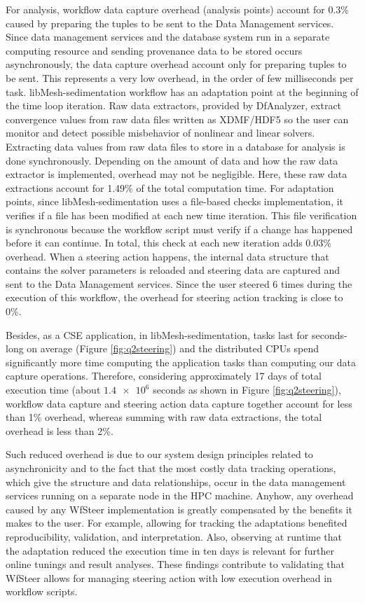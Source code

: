 For analysis, workflow data capture overhead (analysis points) account for 0.3\% caused by preparing the tuples to be sent to the Data Management services.
Since
data management services and the database system run in a separate
computing resource and sending provenance data to be stored occurs
asynchronously, the data capture overhead account only for preparing
tuples to be sent. This represents a very low overhead, in the order of
few milliseconds per task.
libMesh-sedimentation workflow has an adaptation point at the beginning of the time loop iteration.
Raw data extractors, provided by DfAnalyzer, extract convergence values from raw data files written as XDMF/HDF5 so the user can monitor and detect possible misbehavior of nonlinear and linear solvers.
Extracting data values from raw data files to store in a
database for analysis is done synchronously. Depending on the amount
of data and how the raw data extractor is implemented, overhead may not
be negligible. Here, these raw data extractions account for 1.49\% of the total computation time. For adaptation points, since libMesh-sedimentation uses a file-based checks implementation, it verifies if a file has been modified at each new time iteration. This file verification is synchronous because the workflow script must verify if a change has happened before it can continue. In total, this check at each new iteration adds 0.03\% overhead.
When a steering action happens, the internal data structure that contains the solver parameters is reloaded and steering data are captured and sent to the Data Management services. Since the user steered 6 times during the execution of this workflow, the overhead for steering action tracking is close to 0\%.

Besides, as a CSE application, in libMesh-sedimentation, tasks last for seconds-long on average (Figure \ref{fig:q2steering})
and the distributed CPUs spend significantly more time computing the application tasks than computing our data capture operations.
Therefore, considering approximately 17 days of total execution time (about $\num{1.4e6}$ seconds as shown in Figure \ref{fig:q2steering}), workflow data capture and steering action data capture together account for less than 1\% overhead, whereas summing with raw data extractions, the total overhead is less than 2\%.


Such reduced overhead is due to our system design principles related to asynchronicity and to the fact that the most costly data tracking operations, which give the structure and
data relationships, occur in the data management services running on a separate node in the HPC machine.
Anyhow, any overhead caused by any WfSteer implementation is greatly compensated by the benefits it makes to the user. For example, allowing for tracking the adaptations benefited reproducibility, validation, and interpretation. Also, observing at runtime that the adaptation reduced the execution time in ten days is relevant for further online tunings and result analyses.
These findings contribute to validating that WfSteer allows for managing steering action with low execution overhead in workflow scripts.
